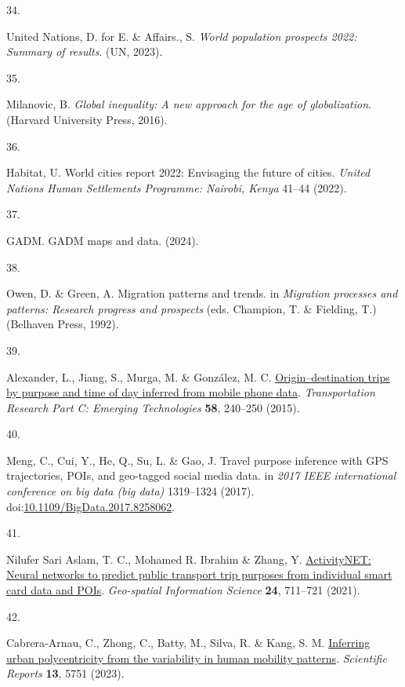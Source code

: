 \documentclass[
  11pt,
]{article}
\newlength{\cslhangindent}
\newlength{\csllabelwidth}
\newenvironment{CSLReferences}[2] %
 {\begin{list}{}{%
  \setlength{\itemindent}{0pt}
  \setlength{\leftmargin}{0pt}
  \setlength{\parsep}{0pt}
  \ifodd #1
   \setlength{\leftmargin}{\cslhangindent}
   \setlength{\itemindent}{-1\cslhangindent}
  \fi
  \setlength{\itemsep}{#2\baselineskip}}}
 {\end{list}}
\newcommand{\CSLLeftMargin}[1]{\parbox[t]{\csllabelwidth}{\strut#1\strut}}
\newcommand{\CSLRightInline}[1]{\parbox[t]{\linewidth - \csllabelwidth}{\strut#1\strut}}
\begin{document}
\begin{CSLReferences}{0}{0}
\CSLLeftMargin{34. }%
\CSLRightInline{United Nations, D. for E. \& Affairs., S. \emph{World
population prospects 2022: Summary of results}. (UN, 2023).}

\CSLLeftMargin{35. }%
\CSLRightInline{Milanovic, B. \emph{Global inequality: A new approach
for the age of globalization}. (Harvard University Press, 2016).}

\CSLLeftMargin{36. }%
\CSLRightInline{Habitat, U. World cities report 2022: Envisaging the
future of cities. \emph{United Nations Human Settlements Programme:
Nairobi, Kenya} 41--44 (2022).}

\CSLLeftMargin{37. }%
\CSLRightInline{GADM. GADM maps and data. (2024).}

\CSLLeftMargin{38. }%
\CSLRightInline{Owen, D. \& Green, A. Migration patterns and trends. in
\emph{Migration processes and patterns: Research progress and prospects}
(eds. Champion, T. \& Fielding, T.) (Belhaven Press, 1992).}

\CSLLeftMargin{39. }%
\CSLRightInline{Alexander, L., Jiang, S., Murga, M. \& González, M. C.
\href{https://doi.org/10.1016/j.trc.2015.02.018}{Origin--destination
trips by purpose and time of day inferred from mobile phone data}.
\emph{Transportation Research Part C: Emerging Technologies}
\textbf{58}, 240--250 (2015).}

\CSLLeftMargin{40. }%
\CSLRightInline{Meng, C., Cui, Y., He, Q., Su, L. \& Gao, J. Travel
purpose inference with GPS trajectories, POIs, and geo-tagged social
media data. in \emph{2017 IEEE international conference on big data (big
data)} 1319--1324 (2017).
doi:\href{https://doi.org/10.1109/BigData.2017.8258062}{10.1109/BigData.2017.8258062}.}

\CSLLeftMargin{41. }%
\CSLRightInline{Nilufer Sari Aslam, T. C., Mohamed R. Ibrahim \& Zhang,
Y. \href{https://doi.org/10.1080/10095020.2021.1985943}{ActivityNET:
Neural networks to predict public transport trip purposes from
individual smart card data and POIs}. \emph{Geo-spatial Information
Science} \textbf{24}, 711--721 (2021).}

\CSLLeftMargin{42. }%
\CSLRightInline{Cabrera-Arnau, C., Zhong, C., Batty, M., Silva, R. \&
Kang, S. M. \href{https://doi.org/10.1038/s41598-023-33003-7}{Inferring
urban polycentricity from the variability in human mobility patterns}.
\emph{Scientific Reports} \textbf{13}, 5751 (2023).}


\end{CSLReferences}
\end{document}
